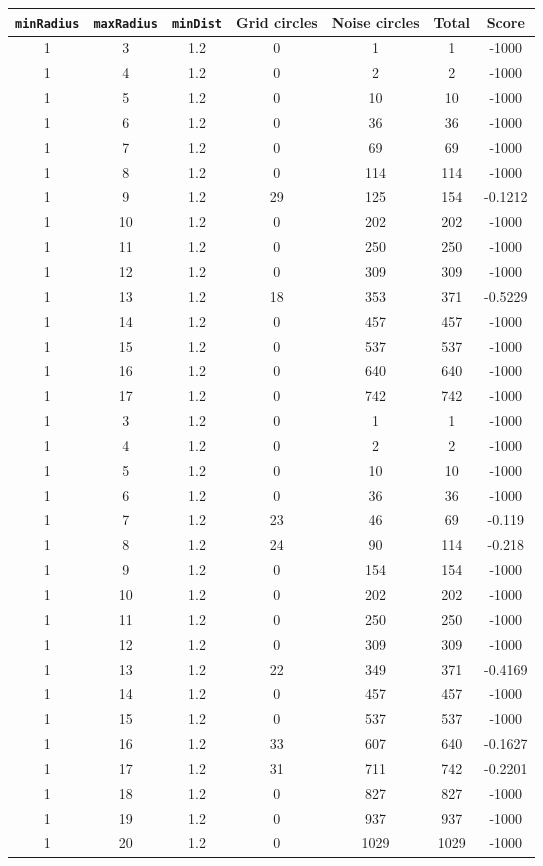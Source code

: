 \documentclass[letterpaper, 12pt]{article}
\begin{document}
\begin{longtable}{|c|c|c|c|c|c|c|}
\hline
\textbf{\texttt{minRadius}} & \textbf{\texttt{maxRadius}} & \textbf{\texttt{minDist}} & \textbf{Grid circles} & \textbf{Noise circles} & \textbf{Total} & \textbf{Score} \\
\hline
1 & 3 & 1.2 & 0 & 1 & 1 & -1000 \\
\hline
1 & 4 & 1.2 & 0 & 2 & 2 & -1000 \\
\hline
1 & 5 & 1.2 & 0 & 10 & 10 & -1000 \\
\hline
1 & 6 & 1.2 & 0 & 36 & 36 & -1000 \\
\hline
1 & 7 & 1.2 & 0 & 69 & 69 & -1000 \\
\hline
1 & 8 & 1.2 & 0 & 114 & 114 & -1000 \\
\hline
1 & 9 & 1.2 & 29 & 125 & 154 & -0.1212 \\
\hline
1 & 10 & 1.2 & 0 & 202 & 202 & -1000 \\
\hline
1 & 11 & 1.2 & 0 & 250 & 250 & -1000 \\
\hline
1 & 12 & 1.2 & 0 & 309 & 309 & -1000 \\
\hline
1 & 13 & 1.2 & 18 & 353 & 371 & -0.5229 \\
\hline
1 & 14 & 1.2 & 0 & 457 & 457 & -1000 \\
\hline
1 & 15 & 1.2 & 0 & 537 & 537 & -1000 \\
\hline
1 & 16 & 1.2 & 0 & 640 & 640 & -1000 \\
\hline
1 & 17 & 1.2 & 0 & 742 & 742 & -1000 \\
\hline
1 & 3 & 1.2 & 0 & 1 & 1 & -1000 \\
\hline
1 & 4 & 1.2 & 0 & 2 & 2 & -1000 \\
\hline
1 & 5 & 1.2 & 0 & 10 & 10 & -1000 \\
\hline
1 & 6 & 1.2 & 0 & 36 & 36 & -1000 \\
\hline
1 & 7 & 1.2 & 23 & 46 & 69 & -0.119 \\
\hline
1 & 8 & 1.2 & 24 & 90 & 114 & -0.218 \\
\hline
1 & 9 & 1.2 & 0 & 154 & 154 & -1000 \\
\hline
1 & 10 & 1.2 & 0 & 202 & 202 & -1000 \\
\hline
1 & 11 & 1.2 & 0 & 250 & 250 & -1000 \\
\hline
1 & 12 & 1.2 & 0 & 309 & 309 & -1000 \\
\hline
1 & 13 & 1.2 & 22 & 349 & 371 & -0.4169 \\
\hline
1 & 14 & 1.2 & 0 & 457 & 457 & -1000 \\
\hline
1 & 15 & 1.2 & 0 & 537 & 537 & -1000 \\
\hline
1 & 16 & 1.2 & 33 & 607 & 640 & -0.1627 \\
\hline
1 & 17 & 1.2 & 31 & 711 & 742 & -0.2201 \\
\hline
1 & 18 & 1.2 & 0 & 827 & 827 & -1000 \\
\hline
1 & 19 & 1.2 & 0 & 937 & 937 & -1000 \\
\hline
1 & 20 & 1.2 & 0 & 1029 & 1029 & -1000 \\
\hline
\end{longtable}
\end{document}
